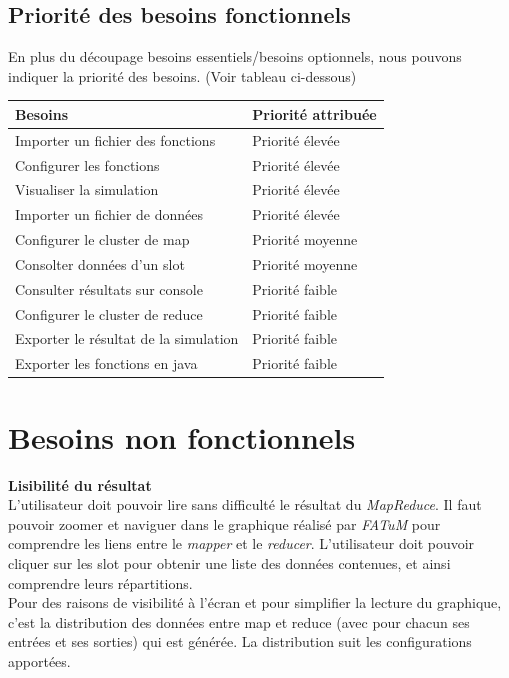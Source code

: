 \subsection{Priorité des besoins fonctionnels}
En plus du découpage besoins essentiels/besoins optionnels, nous pouvons indiquer la priorité des besoins. (Voir tableau ci-dessous)
\begin{center}
\begin{tabularx}{\textwidth}{|X|X|}
  \hline {\bf Besoins} & {\bf Priorité attribuée} \\[4ex]

  \hline Importer un fichier des fonctions & Priorité élevée\\[2ex]
  \hline Configurer les fonctions & Priorité élevée\\[2ex]
  \hline Visualiser la simulation & Priorité élevée\\[2ex]
  \hline Importer un fichier de données & Priorité élevée\\[2ex]
  \hline Configurer le cluster de map & Priorité moyenne\\[2ex]
  \hline Consolter données d'un slot & Priorité moyenne\\[2ex]
  \hline Consulter résultats sur console & Priorité faible\\[2ex]
  \hline Configurer le cluster de reduce & Priorité faible\\[2ex]
  \hline Exporter le résultat de la simulation & Priorité faible\\[2ex]
  \hline Exporter les fonctions en java & Priorité faible\\[2ex]
  \hline
\end{tabularx}
\end{center}
\section{Besoins non fonctionnels}



\textbf{Lisibilité du résultat\\} L'utilisateur doit pouvoir lire sans difficulté le résultat du \textit{MapReduce}. Il faut pouvoir zoomer et naviguer dans le graphique réalisé par \textit{FATuM} pour comprendre les liens entre le \textit{mapper} et le \textit{reducer}. L'utilisateur doit pouvoir cliquer sur les slot pour obtenir une liste des données contenues, et ainsi comprendre leurs répartitions.\\

Pour des raisons de visibilité à l'écran et pour simplifier la lecture du graphique, c'est la distribution des données entre map et reduce (avec pour chacun ses entrées et ses sorties) qui est générée. La distribution suit les configurations apportées.

